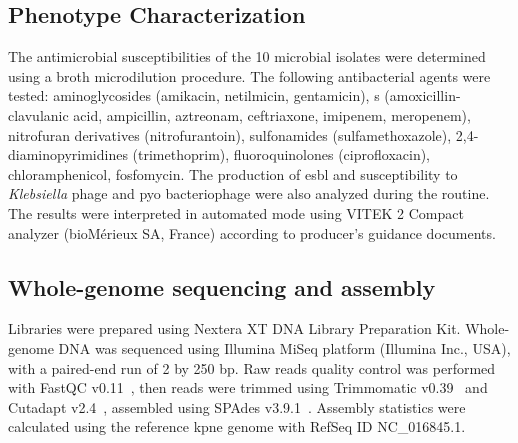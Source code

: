 \subsection{Phenotype Characterization}\label{subsec:phe}
The antimicrobial susceptibilities of the 10 microbial isolates were determined using a broth microdilution procedure.
The following antibacterial agents were tested: aminoglycosides (amikacin, netilmicin, gentamicin),
\betalactam s (amoxicillin-clavulanic acid, ampicillin, aztreonam, ceftriaxone, imipenem, meropenem),
nitrofuran derivatives (nitrofurantoin), sulfonamides (sulfamethoxazole), 2,4-diaminopyrimidines (trimethoprim),
fluoroquinolones (ciprofloxacin), chloramphenicol, fosfomycin.
The production of \gls{esbl} and susceptibility to \textit{Klebsiella} phage and pyo bacteriophage
were also analyzed during the routine.
The results were interpreted in automated mode using VITEK 2 Compact analyzer (bioMérieux SA, France) according to
producer's guidance documents.

\subsection{Whole-genome sequencing and assembly}\label{subsec:proc_raw}
Libraries were prepared using Nextera XT DNA Library Preparation Kit.
Whole-genome DNA was sequenced using Illumina MiSeq platform (Illumina Inc., USA),
with a paired-end run of 2 by 250 bp.
Raw reads quality control was performed with FastQC v0.11~\cite{FastQC},  %
then reads were trimmed using Trimmomatic v0.39~\cite{Trimmomatic}
and Cutadapt v2.4~\cite{Cutadapt},
assembled using SPAdes v3.9.1~\cite{SPAdes}.
Assembly statistics were calculated using the reference \gls{kpne} genome with RefSeq ID NC\_016845.1.

